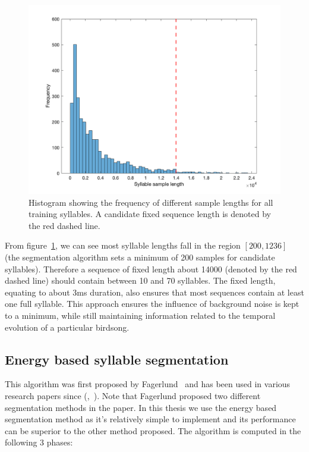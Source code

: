 \begin{figure}[ht]
  \centering
  \includegraphics[width=\textwidth]{figures/syllable_sample_length.png}
  \caption{Histogram showing the frequency of different sample lengths for all
  training syllables. A candidate fixed sequence length is denoted by the red
dashed line.}\label{fig:syllable_sample_lengths}
\end{figure}

From figure~\ref{fig:syllable_sample_lengths}, we can see most syllable lengths
fall in the region $\left[ 200, 1236 \right]$ (the segmentation algorithm sets a
minimum of 200 samples for candidate syllables). Therefore a sequence of fixed
length about 14000 (denoted by the red dashed line) should contain between 10
and 70 syllables. The fixed length, equating to about 3ms duration, also ensures
that most sequences contain at least one full syllable. This approach ensures
the influence of background noise is kept to a minimum, while still maintaining
information related to the temporal evolution of a particular birdsong.

\subsection{Energy based syllable segmentation}\label{ssec:syllable_seg}

This algorithm was first proposed by Fagerlund~\cite{fagerlund2004automatic}
and has been used in various research papers since
(\cite{somervuo2006parametric},~\cite{ramashini2022robust}). Note that Fagerlund
proposed two different segmentation methods in the paper. In this thesis we use
the energy based segmentation method as it's relatively
simple to implement and its performance can be superior to the other method
proposed. The algorithm is computed in the following 3 phases:

